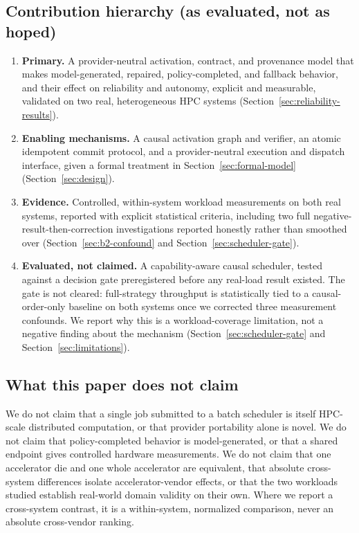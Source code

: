 \subsection{Contribution hierarchy (as evaluated, not as hoped)}
\label{sec:contributions}

\begin{enumerate}
  \item \textbf{Primary.} A provider-neutral activation, contract, and provenance model that makes model-generated, repaired, policy-completed, and fallback behavior, and their effect on reliability and autonomy, explicit and measurable, validated on two real, heterogeneous HPC systems (Section~\ref{sec:reliability-results}).
  \item \textbf{Enabling mechanisms.} A causal activation graph and verifier, an atomic idempotent commit protocol, and a provider-neutral execution and dispatch interface, given a formal treatment in Section~\ref{sec:formal-model} (Section~\ref{sec:design}).
  \item \textbf{Evidence.} Controlled, within-system workload measurements on both real systems, reported with explicit statistical criteria, including two full negative-result-then-correction investigations reported honestly rather than smoothed over (Section~\ref{sec:b2-confound} and Section~\ref{sec:scheduler-gate}).
  \item \textbf{Evaluated, not claimed.} A capability-aware causal scheduler, tested against a decision gate preregistered before any real-load result existed. The gate is not cleared: full-strategy throughput is statistically tied to a causal-order-only baseline on both systems once we corrected three measurement confounds. We report why this is a workload-coverage limitation, not a negative finding about the mechanism (Section~\ref{sec:scheduler-gate} and Section~\ref{sec:limitations}).
\end{enumerate}

\subsection{What this paper does not claim}
\label{sec:non-claims}

We do not claim that a single job submitted to a batch scheduler is itself HPC-scale distributed computation, or that provider portability alone is novel. We do not claim that policy-completed behavior is model-generated, or that a shared endpoint gives controlled hardware measurements. We do not claim that one accelerator die and one whole accelerator are equivalent, that absolute cross-system differences isolate accelerator-vendor effects, or that the two workloads studied establish real-world domain validity on their own. Where we report a cross-system contrast, it is a within-system, normalized comparison, never an absolute cross-vendor ranking.
